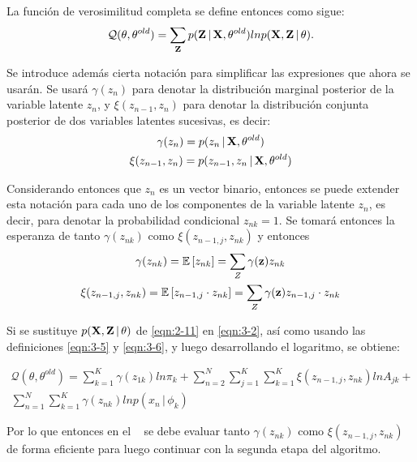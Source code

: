 La función de verosimilitud completa se define entonces como sigue:
\begin{equation}
\mathcal{Q}(\theta, \theta^{old}) = 
  \sum_{\textbf{Z}} p(\textbf{Z} \,|\, \textbf{X}, \theta^{old})
  ln p(\textbf{X}, \textbf{Z} \,|\, \theta).
\label{eqn:3-2}
\end{equation}

Se introduce además cierta notación para simplificar las expresiones que ahora se usarán. Se usará $\gamma(z_n)$ para denotar la distribución marginal posterior de la variable latente $z_n$, y $\xi(z_{n-1}, z_n)$ para denotar la distribución conjunta posterior de dos variables latentes sucesivas, es decir: 
\begin{gather}
\gamma(z_n) = p(z_n \,|\, \textbf{X}, \theta^{old}) \label{eqn:3-3} \\
\xi(z_{n-1}, z_n) = p(z_{n-1}, z_n \,|\, \textbf{X}, \theta^{old}) \label{eqn:3-4}
\end{gather}

Considerando entonces que $z_n$ es un vector binario, entonces se puede extender esta notación para cada uno de los componentes de la variable latente $z_n$, es decir, para denotar la probabilidad condicional $z_{nk} = 1$. Se
tomará entonces la esperanza de tanto $\gamma(z_{nk})$ como $\xi(z_{n-1, j}, z_{nk})$ y entonces
\begin{gather}
\gamma(z_{nk}) = \mathbb{E} \left[ z_{nk} \right] = \sum_Z  \gamma(\textbf{z}) z_{nk} \label{eqn:3-5} \\
\xi(z_{n-1,j}, z_{nk}) = \mathbb{E} \left[z_{n-1, j} \cdot z_{nk} \right] = \sum_Z  \gamma(\textbf{z}) z_{n-1, j} 
\cdot z_{nk}
\label{eqn:3-6}
\end{gather}

Si se sustituye $p(\textbf{X}, \textbf{Z} \,|\, \theta)$ de \eqref{eqn:2-11} en \eqref{eqn:3-2}, así como usando las definiciones \eqref{eqn:3-5} y \eqref{eqn:3-6}, y luego desarrollando el logaritmo, se obtiene: 

\begin{equation}
\begin{split}
\mathcal{Q}(\theta, \theta^{old}) = 
  \sum_{k=1}^K \gamma(z_{1k}) ln \pi_k + 
  \sum_{n=2}^N \sum_{j=1}^K \sum_{k=1}^K \xi(z_{n-1,j}, z_{nk}) ln A_{jk} + \\
  \sum_{n=1}^N \sum_{k=1}^K \gamma(z_{nk}) ln p(x_n \,|\, \phi_k)
\label{eqn:3-7}
\end{split}
\end{equation}

Por lo que entonces en el \estep~ se debe evaluar tanto $\gamma(z_{nk})$ como $\xi(z_{n-1,j}, z_{nk})$ de forma eficiente para luego continuar con la segunda etapa del algoritmo.

